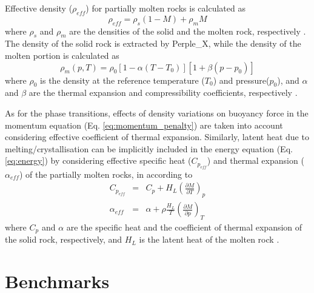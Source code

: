 \documentclass[hidelinks,10pt,a4paper]{article}
\begin{document}
Effective density ($\rho_{eff}$) for partially molten rocks is calculated as
\begin{equation}\label{eq:melt_dens}
\rho_{eff}=\rho_s(1-M)+\rho_m M
\end{equation}
where $\rho_s$ and $\rho_m$ are the densities of the solid and the molten rock, respectively \citep{Gerya2003a,Wang2016}. The density of the solid rock is
extracted by Perple\_X, while the density of the molten portion is calculated as
\begin{equation}\label{eq:melt_dens_M}
\rho_m(p,T)=\rho_0[1-\alpha(T-T_0)][1+\beta(p-p_0)]
\end{equation}
where $\rho_0$ is the density at the reference temperature ($T_0$) and pressure($p_0$), and $\alpha$ and $\beta$ are the thermal expansion and compressibility
coefficients, respectively \citep{Gerya2003a,Wang2016}.

As for the phase transitions, effects of density variations on buoyancy force in the momentum equation (Eq. \ref{eq:momentum_penalty}) are taken into account
considering effective coefficient of thermal expansion. Similarly, latent heat due to melting/crystallisation can be implicitly included in the energy equation
(Eq. \ref{eq:energy}) by considering effective specific heat ($C_{p_{eff}}$) and thermal expansion ($\alpha_{eff}$) of the partially molten rocks, in according to
\begin{eqnarray}
\label{eq:cp_effective}C_{p_{eff}}&=&C_p+H_L\left(\frac{\partial M}{\partial T}\right)_p \\
\label{eq:alpha_effective}\alpha_{eff}&=&\alpha+\rho\frac{H_L}{T}\left(\frac{\partial M}{\partial p}\right)_T
\end{eqnarray}
where $C_p$ and $\alpha$ are the specific heat and the coefficient of thermal expansion of the solid rock, respectively, and $H_L$ is the latent heat of the
molten rock \citep{Gerya2003a,Gerya2007,Tackley2010}.

\section{Benchmarks}\label{sec:benchmark}
\end{document}

